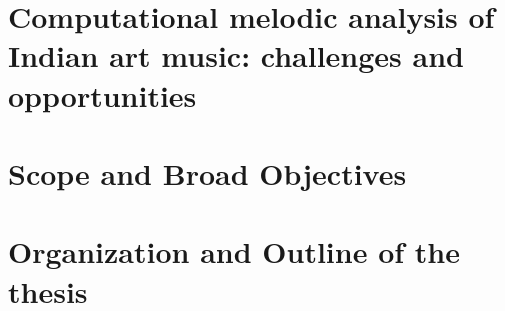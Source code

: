 \section{Computational melodic analysis of Indian art music: challenges and opportunities}
\label{sec:intro_challenges_oppurtunities}

%
%

\section{Scope and Broad Objectives}
\label{sec:intro_scope_context_relevance}

\section{Organization and Outline of the thesis}
\label{sec:intro_organization}
